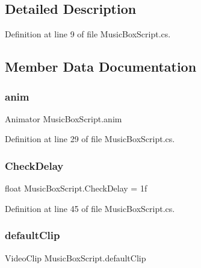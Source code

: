 \subsection{Detailed Description}


Definition at line 9 of file Music\+Box\+Script.\+cs.



\subsection{Member Data Documentation}
\mbox{\label{class_music_box_script_a466b8f3f5b4e00af10a0b5c0b3a346e7}} 
\subsubsection{\texorpdfstring{anim}{anim}}
{\footnotesize\ttfamily Animator Music\+Box\+Script.\+anim}



Definition at line 29 of file Music\+Box\+Script.\+cs.

\mbox{\label{class_music_box_script_a015f6762d90752421ef7372ee32979fc}} 
\subsubsection{\texorpdfstring{CheckDelay}{CheckDelay}}
{\footnotesize\ttfamily float Music\+Box\+Script.\+Check\+Delay = 1f}



Definition at line 45 of file Music\+Box\+Script.\+cs.

\mbox{\label{class_music_box_script_ad2c55059bedf46cb2c448f7cd6663e02}} 
\subsubsection{\texorpdfstring{defaultClip}{defaultClip}}
{\footnotesize\ttfamily Video\+Clip Music\+Box\+Script.\+default\+Clip}



